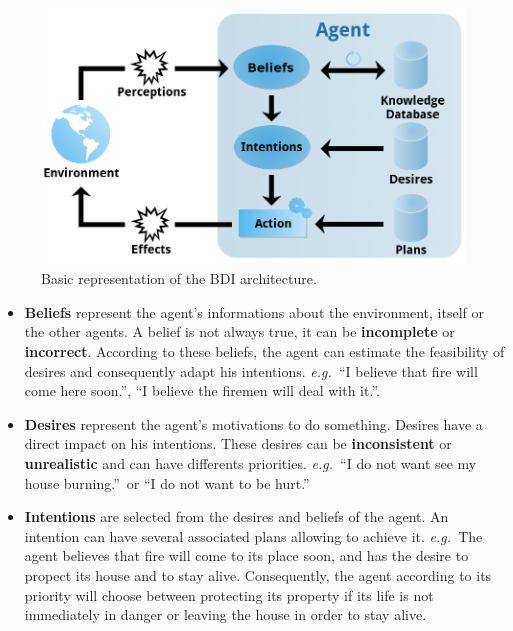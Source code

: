 \documentclass[12pt, a4paper]{memoir} %
\newcommand{\eg}{\emph{e.g.~}}
\begin{document}
			\begin{figure}
				\begin{center}
					\includegraphics[scale=0.4]{bdi_graph.png}
					\caption{\label{fig:bdi-graph}Basic representation of the BDI architecture.}
				\end{center}
			\end{figure}

			\begin{itemize}
				\item \textbf{Beliefs} represent the agent's informations about the environment, itself or the other agents.
				A belief is not always true, it can be \textbf{incomplete} or \textbf{incorrect}.
				According to these beliefs, the agent can estimate the feasibility of desires and consequently adapt his intentions.
				\newline
				\eg \textquotedblleft I believe that fire will come here soon.\textquotedblright, \textquotedblleft I believe the firemen will deal with it.\textquotedblright.
				\item \textbf{Desires} represent the agent's motivations to do something. Desires have a direct impact on his intentions.
				These desires can be \textbf{inconsistent} or \textbf{unrealistic} and can have differents priorities.
				\newline
				\eg \textquotedblleft I do not want see my house burning.\textquotedblright ~or \textquotedblleft I do not want to be hurt.\textquotedblright
				\item \textbf{Intentions} are selected from the desires and beliefs of the agent. An intention can have several associated plans allowing to achieve it.
				\newline
				\eg The agent believes that fire will come to its place soon, and has the desire to propect its house and to stay alive.
				Consequently, the agent according to its priority will choose between protecting its property if its life is
				not immediately in danger or leaving the house in order to stay alive.
			\end{itemize}
\end{document}
